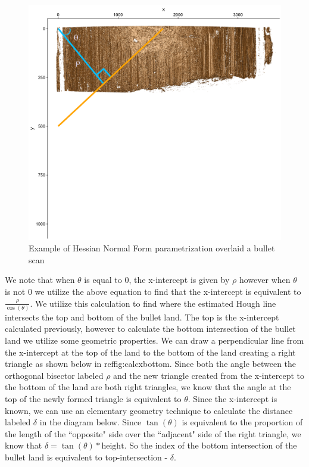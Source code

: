 \documentclass[12pt]{article}\usepackage[]{graphicx}\usepackage[]{color}
\newenvironment{knitrout}{}{} %
\theoremstyle{nonumberplain}
\begin{document}
\begin{knitrout}
\color{fgcolor}\begin{figure}

{\centering \includegraphics[width=0.5\linewidth]{../images/hessian-example} 

}

\caption[Example of Hessian Normal Form parametrization overlaid a bullet scan]{Example of Hessian Normal Form parametrization overlaid a bullet scan}\label{fig:hessian-graphic-inclusion}
\end{figure}


\end{knitrout}

We note that when $\theta$ is equal to 0, the x-intercept is given by $\rho$ however when $\theta$ is not 0 we utilize the above equation to find that the x-intercept is equivalent to $\frac{\rho}{\cos(\theta)}$.  We utilize this calculation to find where the estimated Hough line intersects the top and bottom of the bullet land. The top is the x-intercept calculated previously, however to calculate the bottom intersection of the bullet land we utilize some geometric properties. We can draw a perpendicular line from the x-intercept at the top of the land to the bottom of the land creating a right triangle as shown below in ref{fig:calcxbottom}. Since both the angle between the orthogonal bisector labeled $\rho$ and the new triangle created from the x-intercept to the bottom of the land are both right triangles, we know that the angle at the top of the newly formed triangle is equivalent to $\theta$. Since the x-intercept is known, we can use an elementary geometry technique to calculate the distance labeled $\delta$ in the diagram below. Since $\tan(\theta)$ is equivalent to the proportion of the length of the ``opposite" side over the ``adjacent" side of the right triangle, we know that $\delta = \tan(\theta)*\text{height}$. So the index of the bottom intersection of the bullet land is equivalent to top-intersection - $\delta$. 
\end{document}
